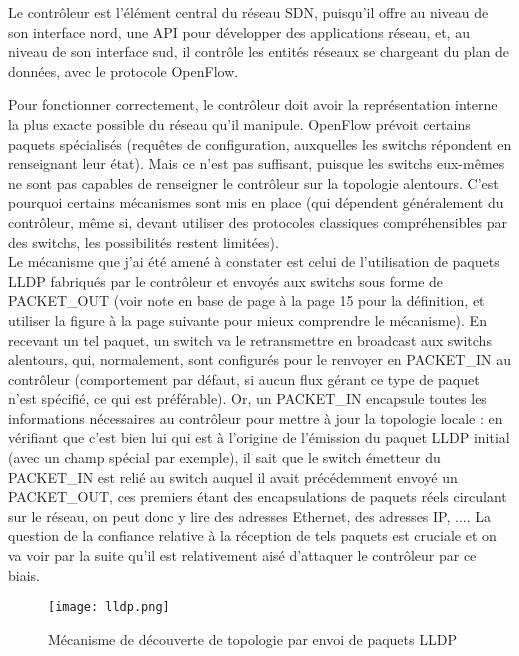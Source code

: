 Le contrôleur est l'élément central du réseau SDN, puisqu'il offre au niveau de son interface nord, une API pour développer des applications réseau, et, au niveau de son interface sud, il contrôle les entités réseaux se chargeant du plan de données, avec le protocole OpenFlow.

Pour fonctionner correctement, le contrôleur doit avoir la représentation interne la plus exacte possible du réseau qu'il manipule. OpenFlow prévoit certains paquets spécialisés (requêtes de configuration, auxquelles les switchs répondent en renseignant leur état). Mais ce n'est pas suffisant, puisque les switchs eux-mêmes ne sont pas capables de renseigner le contrôleur sur la topologie alentours. C'est pourquoi certains mécanismes sont mis en place (qui dépendent généralement du contrôleur, même si, devant utiliser des protocoles classiques compréhensibles par des switchs, les possibilités restent limitées).\\
Le mécanisme que j'ai été amené à constater est celui de l'utilisation de paquets LLDP fabriqués par le contrôleur et envoyés aux switchs sous forme de PACKET\_OUT (voir note en base de page à la page 15 pour la définition, et utiliser la figure à la page suivante pour mieux comprendre le mécanisme). En recevant un tel paquet, un switch va le retransmettre en broadcast aux switchs alentours, qui, normalement, sont configurés pour le renvoyer en PACKET\_IN au contrôleur (comportement par défaut, si aucun flux gérant ce type de paquet n'est spécifié, ce qui est préférable). Or, un PACKET\_IN encapsule toutes les informations nécessaires au contrôleur pour mettre à jour la topologie locale : en vérifiant que c'est bien lui qui est à l'origine de l'émission du paquet LLDP initial (avec un champ spécial par exemple), il sait que le switch émetteur du PACKET\_IN est relié au switch auquel il avait précédemment envoyé un PACKET\_OUT, ces premiers étant des encapsulations de paquets réels circulant sur le réseau, on peut donc y lire des adresses Ethernet, des adresses IP, .... La question de la confiance relative à la réception de tels paquets est cruciale et on va voir par la suite qu'il est relativement aisé d'attaquer le contrôleur par ce biais.\\

\begin{figure}[h]
  	\centering
  	\texttt{[image: lldp.png]}
  	\caption{Mécanisme de découverte de topologie par envoi de paquets LLDP}
\end{figure}

